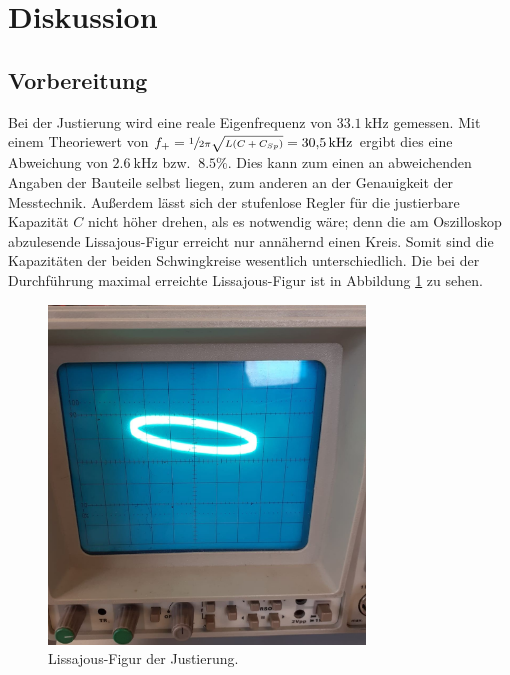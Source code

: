 \section{Diskussion}
\label{sec:Diskussion}

\subsection{Vorbereitung}
Bei der Justierung wird eine reale Eigenfrequenz von $\SI{33.1}{\kilo\hertz}$ gemessen. Mit einem Theoriewert von $f_+ = \sfrac{1}{2\pi\sqrt{L(C+C_{Sp})}} = \SI{30.5}{\kilo\hertz}$ ergibt dies eine
Abweichung von $\SI{2.6}{\kilo\hertz}$ bzw. $~8.5\%$.
Dies kann zum einen an abweichenden Angaben der Bauteile selbst liegen, %
zum anderen an der Genauigkeit der Messtechnik. Außerdem lässt sich der stufenlose Regler für die justierbare Kapazität $C$
nicht höher drehen, als es notwendig wäre; denn die am Oszilloskop abzulesende Lissajous-Figur erreicht nur annähernd einen Kreis. Somit sind die Kapazitäten der beiden 
Schwingkreise wesentlich unterschiedlich. Die bei der Durchführung maximal erreichte Lissajous-Figur ist in Abbildung \ref{fig:Lissajous} zu sehen.

\begin{figure}
    \centering
    \includegraphics[width=0.75\textwidth]{plots/Lissajous_90Grad.jpeg}
    \caption{Lissajous-Figur der Justierung.}
    \label{fig:Lissajous}
\end{figure}

